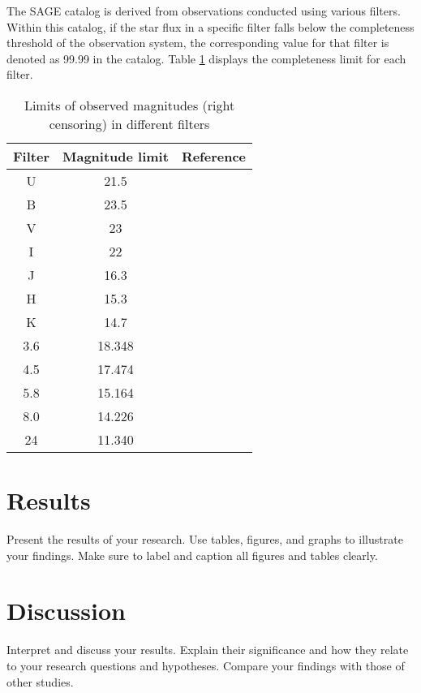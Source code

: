 \documentclass[a4paper, 15pt,usenatbib]{article}
\begin{document}
The SAGE catalog is derived from observations conducted using various filters. Within this catalog, if the star flux in a specific filter falls below the completeness threshold of the observation system, the corresponding value for that filter is denoted as 99.99 in the catalog. Table \ref{tab:right_censoring} displays the completeness limit for each filter.


\begin{table}
    \centering
    \begin{tabular}{ccc}
        \hline
        \hline
        Filter & Magnitude limit  & Reference \\
        \hline
        U & 21.5 & \citep{Zaritsky04} \\ 
        B & 23.5 & \\
        V & 23 & \\
        I & 22 & \\
        \midrule[0.01pt]
        J & 16.3 & \citep{Nikolaev2000} \\ 
        H & 15.3 & \\
        K & 14.7 & \\
        \midrule[0.8pt]
        3.6 & 18.348 & \citep{Meixner06} \\ 
        4.5 & 17.474 & \\
        5.8 & 15.164 & \\
        8.0 & 14.226 & \\
        24 & 11.340 & \\
        \hline
        \hline
    \end{tabular}
    \caption{Limits of observed magnitudes (right censoring) in different filters}
    \label{tab:right_censoring}
\end{table}


\section{Results}
Present the results of your research. Use tables, figures, and graphs to illustrate your findings. Make sure to label and caption all figures and tables clearly.

\section{Discussion}
Interpret and discuss your results. Explain their significance and how they relate to your research questions and hypotheses. Compare your findings with those of other studies.
\end{document}
